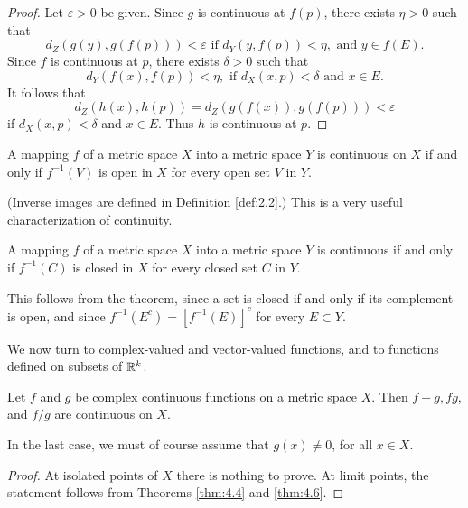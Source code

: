 \begin{proof}
    Let $\varepsilon > 0$ be given. Since $g$ is continuous at $f(p)$, there exists $\eta > 0$ such that 
    \begin{equation*}
        d_Z(g(y), g(f(p))) < \varepsilon \text{ if } d_Y(y,f(p)) < \eta, \text{ and } y \in f(E).
    \end{equation*}
Since $f$ is continuous at $p$, there exists $\delta > 0$ such that
\begin{equation*}
    d_Y(f(x),f(p)) < \eta, \text{ if } d_X(x, p) <\delta \text{ and } x \in E.
\end{equation*}
It follows that
\begin{equation*}
    d_Z(h(x), h(p)) = d_Z(g(f(x)), g(f(p))) < \varepsilon
\end{equation*}
if $d_X(x, p) < \delta$ and $x \in E$. Thus $h$ is continuous at $p$.
\end{proof}

\begin{thm}
    \label{thm:4.8}
    A mapping $f$ of a metric space $X$ into a metric space $Y$ is continuous on $X$ if and only if $f^{-1}(V)$ is open in $X$ for every open set $V$ in $Y$.
\end{thm}

(Inverse images are defined in Definition \ref{def:2.2}.) 
This is a very useful characterization of continuity.

\begin{myCorollary*}
    A mapping $f$ of a metric space $X$ into a metric space $Y$ is continuous if and only if $f^{-1} (C)$ is closed in $X$ for every closed set $C$ in $Y$.
\end{myCorollary*}

This follows from the theorem, since a set is closed if and only if its complement is open, and since $f^{-1}(E^c) = [f^{-1}(E)]^c$ for every $E \subset Y$.

We now turn to complex-valued and vector-valued functions, and to
functions defined on subsets of ${\protect\mathbb R}^{k}$.

\begin{thm}
    \label{thm:4.9}
    Let $f$ and $g$ be complex continuous functions on a metric space $X$.
    Then $f + g,fg$, and $f/g$ are continuous on $X$.
    
    In the last case, we must of course assume that $g(x) \neq 0$, for all $x \in  X$.
\end{thm}
\begin{proof}
    At isolated points of $X$ there is nothing to prove. At limit points,
    the statement follows from Theorems \ref{thm:4.4} and \ref{thm:4.6}.
\end{proof}

